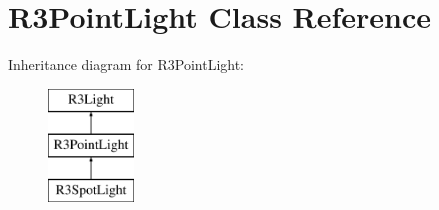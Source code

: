 \hypertarget{class_r3_point_light}{}\section{R3\+Point\+Light Class Reference}
\label{class_r3_point_light}
Inheritance diagram for R3\+Point\+Light\+:\begin{figure}[H]
\begin{center}
\leavevmode
\includegraphics[height=3.000000cm]{class_r3_point_light}
\end{center}
\end{figure}
